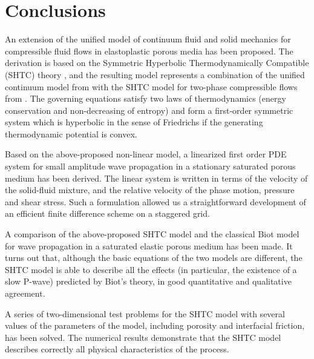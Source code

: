 \documentclass[3p,times,table]{article}
\begin{document}
\section{Conclusions}

An extension of the unified model of continuum fluid and solid mechanics 
\cite{DPRZ2016} for compressible fluid flows in elastoplastic porous media has 
been proposed.
The derivation  is based on the Symmetric Hyperbolic 
Thermodynamically Compatible (SHTC) theory \cite{SHTC-GENERIC-CMAT}, and the 
resulting model represents a combination of the unified continuum model from 
\cite{DPRZ2016} with the SHTC model for two-phase compressible flows from 
\cite{RomDrikToro2010}.
The governing equations satisfy two laws of thermodynamics (energy 
conservation and non-decreasing of  entropy) and form a first-order symmetric  
system 
which 
is hyperbolic in the sense of Friedrichs \cite{Friedrichs1958} if the 
generating thermodynamic potential is convex.

Based on the above-proposed non-linear model, a linearized first order PDE system 
for small amplitude wave propagation in a stationary saturated porous medium 
has been derived. The linear system is written in terms of the velocity of the 
solid-fluid mixture, and the relative velocity of the phase motion, pressure and shear 
stress. Such a formulation allowed us a straightforward development of an 
efficient finite difference scheme on a staggered grid.  

A comparison of the above-proposed SHTC model and the classical Biot model for wave 
propagation in a saturated elastic porous  medium has been made.
It turns out that, although the basic equations of the two models are different, 
the SHTC model is able to describe all the effects (in particular, the 
existence of a slow P-wave) predicted by Biot's theory, in good quantitative 
and qualitative agreement.

A series of two-dimensional test problems for the SHTC model with several 
values of 
the parameters of the model, including porosity and interfacial friction, has been 
solved. The numerical results demonstrate that the SHTC model describes 
correctly all physical characteristics of the process.   
\end{document}
